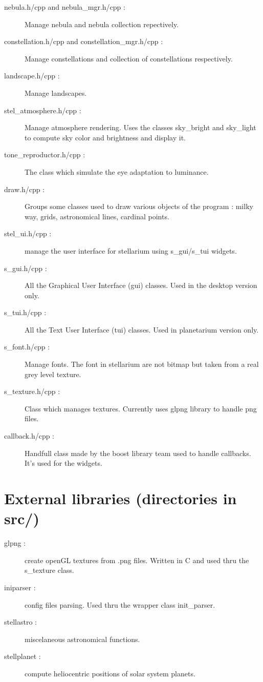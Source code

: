 \documentclass[11pt,oneside] {article}
\begin{document}
\begin{description}
	\item[nebula.h/cpp and nebula\_mgr.h/cpp :]
Manage nebula and nebula collection repectively.

	\item[constellation.h/cpp and constellation\_mgr.h/cpp :]
Manage constellations and collection of constellations respectively.

	\item[landscape.h/cpp :]
Manage landscapes.

	\item[stel\_atmosphere.h/cpp :]
Manage atmosphere rendering. Uses the classes sky\_bright and sky\_light to compute sky color and brightness and display it.

	\item[tone\_reproductor.h/cpp :]
The class which simulate the eye adaptation to luminance.

	\item[draw.h/cpp :]
Groups some classes used to draw various objects of the program : milky way, grids, astronomical lines, cardinal points.

	\item[stel\_ui.h/cpp :] manage the user interface for stellarium using s\_gui/s\_tui widgets.

	\item[s\_gui.h/cpp :]
All the Graphical User Interface (gui) classes. Used in the desktop version only.

	\item[s\_tui.h/cpp :]
All the Text User Interface (tui) classes. Used in planetarium version only.

	\item[s\_font.h/cpp :]
Manage fonts. The font in stellarium are not bitmap but taken from a real grey level texture.

	\item[s\_texture.h/cpp :]
Class which manages textures. Currently uses glpng library to handle png files.

	\item[callback.h/cpp :] Handfull class made by the boost library team used to handle callbacks. It's used for the widgets.
\end{description}

\section{External libraries (directories in src/)}
\begin{description}
	\item[glpng :] create openGL textures from .png files. Written in C and used thru the s\_texture class.
	\item[iniparser :] config files parsing. Used thru the wrapper class init\_parser.
	\item[stellastro :] miscelaneous astronomical functions.
	\item[stellplanet :] compute heliocentric positions of solar system planets.
\end{description}
\end{document}
